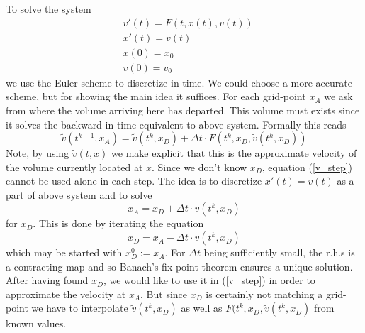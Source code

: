 \documentclass[17pt]{extarticle}
\begin{document}
To solve the system
\begin{align*}
	&v'(t)=F(t,x(t),v(t))\\
	&x'(t)=v(t)\\
	&x(0)=x_0\\
	&v(0)=v_0
\end{align*}
we use the Euler scheme to discretize in time. We could choose a more accurate scheme, but for showing the main idea it suffices. For each grid-point $x_A$ we ask from where the volume arriving here has departed. This volume must exists since it solves the backward-in-time equivalent to above system. Formally this reads
\begin{equation} \label{v_step}
\tilde{v}(t^{k+1}, x_A)=\tilde{v}(t^k, x_D)+\Delta t\cdot F(t^k, x_D, \tilde{v}(t^k, x_D))
\end{equation}
Note, by using $\tilde{v}(t,x)$ we make explicit that this is the approximate velocity of the volume currently located at $x$.
Since we don't know $x_D$, equation (\ref{v_step}) cannot be used alone in each step.
The idea is to discretize $x'(t)=v(t)$ as a part of above system and to solve
\begin{equation}
	x_A=x_D+\Delta t\cdot v(t^k, x_D)
\end{equation} 
for $x_D$.
This is done by iterating the equation
$$
x_D=x_A-\Delta t\cdot v(t^k, x_D)
$$
which may be started with $x_D^0:=x_A$.
For $\Delta t$ being sufficiently small, the r.h.s is a contracting map and so Banach's fix-point theorem ensures a unique solution.
After having found $x_D$, we would like to use it in (\ref{v_step}) in order to approximate the velocity at $x_A$. But since $x_D$ is certainly not matching a grid-point we have to interpolate $\tilde{v}(t^k, x_D)$ as well as $F(t^k, x_D, \tilde{v}(t^k, x_D)$ from known values.
\end{document}
